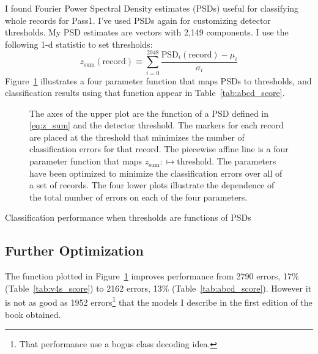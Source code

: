\documentclass[12pt]{article}
\begin{document}
I found Fourier Power Spectral Density estimates (PSDs) useful for
classifying whole records for Pass1.  I've used PSDs again for
customizing detector thresholds.  My PSD estimates are vectors with
2,149 components.  I use  the following 1-d
statistic to set thresholds:
\begin{equation}
  \label{eq:z_sum}
  z_{\text{sum}}(\text{record}) \equiv \sum_{i=0}^{2048}
  \frac{\text{PSD}_i(\text{record}) - \mu_i}{\sigma_i}
\end{equation}
Figure~\ref{fig:shift_threshold} illustrates a four parameter function
that maps PSDs to thresholds, and classification results using that
function appear in Table~\ref{tab:abcd_score}.

\begin{figure}
  \centering
  \caption[A function of PSDs for varying detector thresholds.]{The
    axes of the upper plot are the function of a PSD defined in
    \eqref{eq:z_sum} and the detector threshold.  The markers for each
    record are placed at the threshold that minimizes the number of
    classification errors for that record.  The piecewise affine line
    is a four parameter function that maps
    $z_{\text{sum}}: \mapsto \text{threshold}$.  The parameters have
    been optimized to minimize the classification errors over all of a
    set of records.  The four lower plots illustrate the dependence of
    the total number of errors on each of the four parameters.  }
  \label{fig:shift_threshold}
\end{figure}

\begin{table*}
  \centering
  
  \caption[Performance]{Classification performance when thresholds are
  functions of PSDs}
  \label{tab:abcd_score}
\end{table*}

\clearpage

\subsection{Further Optimization}
\label{sec:further}

The function plotted in Figure~\ref{fig:shift_threshold} improves
performance from 2790 errors, 17\% (Table~\ref{tab:v4s_score}) to 2162
errors, 13\% (Table~\ref{tab:abcd_score}).  However it is not as good
as 1952 errors\footnote{That performance use a bogus class decoding
  idea.} that the models I describe in the first edition of the book
obtained.
\end{document}
